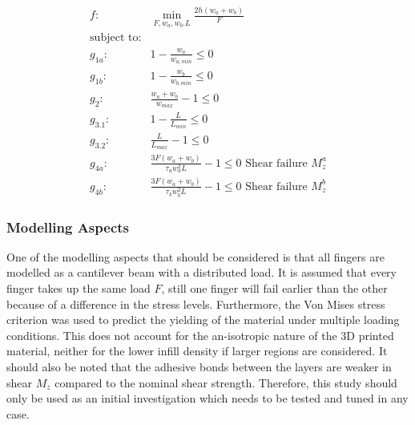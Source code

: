 \begin{align*}
	f: & \min_{F, {w_a}, {w_b}. L}  \frac{2h \left(w_a + w_b\right)}{F} \nonumber \\
	\text{subject to:} & \nonumber \\
	g_{1a}:& 1 - \frac{w_a}{w_{a,min}}  \le 0 \\
	g_{1b}:& 1 - \frac{w_b}{w_{b,min}}  \le 0 \\
	g_2:& \frac{w_a + w_b}{w_{max}}  - 1 \le 0 \\
	g_{3.1}:& 1 - \frac{L}{L_{min}} \le 0 \\
	g_{3.2}:&\frac{L}{L_{max}} - 1  \le 0 \\
	g_{4a}: & \frac{ 3 F \left(w_a + w_b \right) }{ \tau_a w_a ^2 L} - 1 \le 0					\text{ Shear failure } M_z^a \\
	g_{4b}: & \frac{ 3 F \left(w_a + w_b \right) }{ \tau_b w_b ^2 L} - 1 \le 0					\text{ Shear failure } M_z^b 
\end{align*}	
\vspace{-8mm}
\begin{table}[H]
\end{table}



\subsubsection{Modelling Aspects}
One of the modelling aspects that should be considered is that all fingers are modelled as a cantilever beam with a distributed load. 
It is assumed that every finger takes up the same load $F$, still one finger will fail earlier than the other because of a difference in the stress levels. 
Furthermore, the Von Mises stress criterion was used to predict the yielding of the material under multiple loading conditions. 
This does not account for the an-isotropic nature of the 3D printed material, neither for the lower infill density if larger regions are considered. 
It should also be noted that the adhesive bonds between the layers are weaker in shear $M_z$ compared to the nominal shear strength. 
Therefore, this study should only be used as an initial investigation which needs to be tested and tuned in any case.

